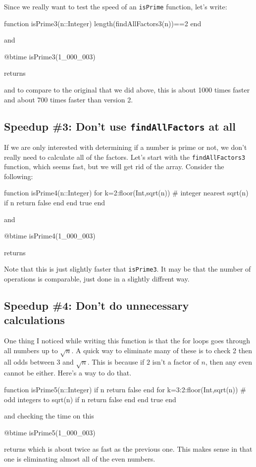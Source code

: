Since we really want to test the speed of an \verb!isPrime! function, let's write:
\begin{jlblock}[nt]
function isPrime3(n::Integer)
  length(findAllFactors3(n))==2
end
\end{jlblock}
%
and
\begin{jlblock}[nt]
@btime isPrime3(1_000_003)
\end{jlblock}
returns  \printpythontex[verbatim]

and to compare to the original that we did above, this is about 1000 times faster and about 700 times faster than version 2.  

\subsection{Speedup \#3: Don't use \texttt{findAllFactors} at all}

If we are only interested with determining if a number is prime or not, we don't really need to calculate all of the factors.  Let's start with the \verb!findAllFactors3! function, which seems fast, but we will get rid of the array. Consider the following:
\begin{jlblock}[nt]
function isPrime4(n::Integer)
  for k=2:floor(Int,sqrt(n)) # integer nearest sqrt(n)
    if n%
      return false
    end
  end
  true
end
\end{jlblock}
and
\begin{jlblock}[nt]
@btime isPrime4(1_000_003)
\end{jlblock}
returns  \printpythontex[verbatim]

Note that this is just slightly faster that \texttt{isPrime3}.  It may be that the number of operations is comparable, just done in a slightly diffrent way.  

\subsection{Speedup \#4: Don't do unnecessary calculations}

One thing I noticed while writing this function is that the for loops goes through all numbers up to $\sqrt{n}$.  A quick way to eliminate many of these is to check 2 then all odds between 3 and $\sqrt{n}$.  This is because if $2$ isn't a factor of $n$, then any even cannot be either.  Here's a way to do that. 

\begin{jlblock}[nt]
function isPrime5(n::Integer)
  if n%
    return false
  end
  for k=3:2:floor(Int,sqrt(n)) # odd integers to sqrt(n)
    if n%
      return false
    end
  end
  true
end
\end{jlblock}
and checking the time on this
\begin{jlblock}[nt]
@btime isPrime5(1_000_003)
\end{jlblock}
returns  \printpythontex[verbatim]
%
which is about twice as fast as the previous one.  This makes sense in that one is eliminating almost all of the even numbers.  

